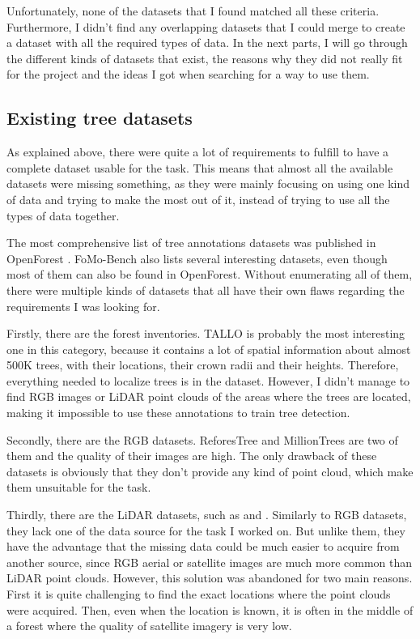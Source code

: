 \documentclass[
]{report}
\begin{document}
Unfortunately, none of the datasets that I found matched all these
criteria. Furthermore, I didn't find any overlapping datasets that I
could merge to create a dataset with all the required types of data. In
the next parts, I will go through the different kinds of datasets that
exist, the reasons why they did not really fit for the project and the
ideas I got when searching for a way to use them.

\subsection{Existing tree datasets}\label{existing-tree-datasets}

As explained above, there were quite a lot of requirements to fulfill to
have a complete dataset usable for the task. This means that almost all
the available datasets were missing something, as they were mainly
focusing on using one kind of data and trying to make the most out of
it, instead of trying to use all the types of data together.

The most comprehensive list of tree annotations datasets was published
in OpenForest \autocite{OpenForest}. FoMo-Bench \autocite{FoMo-Bench}
also lists several interesting datasets, even though most of them can
also be found in OpenForest. Without enumerating all of them, there were
multiple kinds of datasets that all have their own flaws regarding the
requirements I was looking for.

Firstly, there are the forest inventories. TALLO \autocite{TALLO} is
probably the most interesting one in this category, because it contains
a lot of spatial information about almost 500K trees, with their
locations, their crown radii and their heights. Therefore, everything
needed to localize trees is in the dataset. However, I didn't manage to
find RGB images or LiDAR point clouds of the areas where the trees are
located, making it impossible to use these annotations to train tree
detection.

Secondly, there are the RGB datasets. ReforesTree \autocite{ReforesTree}
and MillionTrees \autocite{MillionTrees} are two of them and the quality
of their images are high. The only drawback of these datasets is
obviously that they don't provide any kind of point cloud, which make
them unsuitable for the task.

Thirdly, there are the LiDAR datasets, such as \autocite{WildForest3D}
and \autocite{FOR-instance}. Similarly to RGB datasets, they lack one of
the data source for the task I worked on. But unlike them, they have the
advantage that the missing data could be much easier to acquire from
another source, since RGB aerial or satellite images are much more
common than LiDAR point clouds. However, this solution was abandoned for
two main reasons. First it is quite challenging to find the exact
locations where the point clouds were acquired. Then, even when the
location is known, it is often in the middle of a forest where the
quality of satellite imagery is very low.
\end{document}

